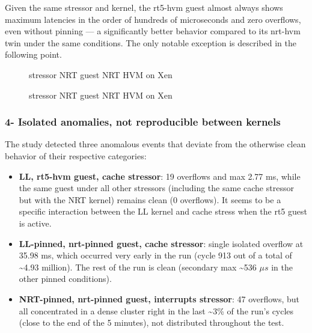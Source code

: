 Given the same stressor and kernel, the rt5-hvm guest almost always
shows maximum latencies in the order of hundreds of microseconds and
zero overflows, even without pinning --- a significantly better behavior
compared to its nrt-hvm twin under the same conditions. The only notable
exception is described in the following point.

\begin{figure}
\centering

\caption{stressor NRT guest NRT HVM on Xen}
\end{figure}

\begin{figure}
\centering

\caption{stressor NRT guest NRT HVM on Xen}
\end{figure}

\subsubsection{4- Isolated anomalies, not reproducible between
kernels}\label{isolated-anomalies-not-reproducible-between-kernels}

The study detected three anomalous events that deviate from the
otherwise clean behavior of their respective categories:

\begin{itemize}
\item
  \textbf{LL, rt5-hvm guest, cache stressor}: 19 overflows and max 2.77
  ms, while the same guest under all other stressors (including the same
  cache stressor but with the NRT kernel) remains clean (0 overflows).
  It seems to be a specific interaction between the LL kernel and cache
  stress when the rt5 guest is active.
\item
  \textbf{LL-pinned, nrt-pinned guest, cache stressor}: single isolated
  overflow at 35.98 ms, which occurred very early in the run (cycle 913
  out of a total of \textasciitilde4.93 million). The rest of the run is
  clean (secondary max \textasciitilde536 $\mu s$ in the other pinned
  conditions).
\item
  \textbf{NRT-pinned, nrt-pinned guest, interrupts stressor}: 47
  overflows, but all concentrated in a dense cluster right in the last
  \textasciitilde3\% of the run's cycles (close to the end of the 5
  minutes), not distributed throughout the test.
\end{itemize}


